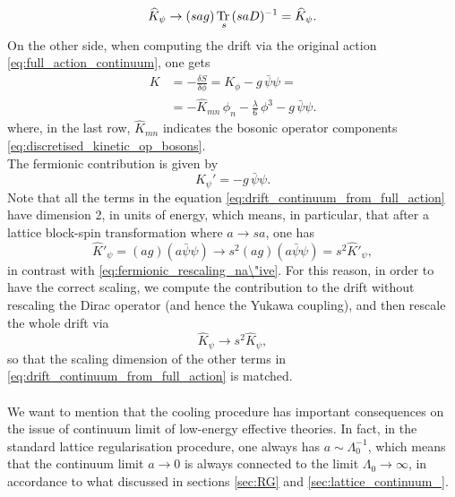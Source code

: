\begin{equation}
    \widehat{K}_{\psi} \to  (sag) \, \underset{s}{\operatorname{\text{Tr} \,}}{(saD)^{-1}} = \widehat{K}_{\psi}.
    \label{eq:fermionic_rescaling_na\"ive}
\end{equation}
On the other side, when computing the drift via the original action \eqref{eq:full_action_continuum}, one gets
\begin{equation}
    \begin{aligned}
        K &= - \frac{\delta S}{\delta \phi} = K_\phi - g \, \bar\psi\psi = \\
        &= - \hat K_{mn} \, \phi_n - \frac{\lambda}{6} \, \phi^3 - g \, \bar\psi\psi.
    \end{aligned}
    \label{eq:drift_continuum_from_full_action}
\end{equation}
where, in the last row, $\widehat{K}_{mn}$ indicates the bosonic operator components \eqref{eq:discretised_kinetic_op_bosons}.\\
The fermionic contribution is given by
\begin{equation*}
    K_{\psi}' = - g \, \bar\psi\psi.
\end{equation*}
Note that all the terms in the equation \eqref{eq:drift_continuum_from_full_action} have dimension 2, in units of energy, which means, in particular, that after a lattice block-spin transformation where $a \to sa$, one has
\begin{equation}
    \widehat{K}'_\psi = (ag) (a\bar\psi \psi) \to s^2 (ag) (a\bar\psi \psi) = s^2 \widehat{K}'_\psi,
    \label{eq:rescaling_blinear}
\end{equation}
in contrast with \eqref{eq:fermionic_rescaling_na\"ive}. For this reason, in order to have the correct scaling, we compute the contribution to the drift without rescaling the Dirac operator (and hence the Yukawa coupling), and then rescale the whole drift via 
\begin{equation*}
    \widehat{K}_\psi \to s^2 \widehat{K}_\psi,
\end{equation*}
so that the scaling dimension of the other terms in \eqref{eq:drift_continuum_from_full_action} is matched. \\~\\
We want to mention that the cooling procedure has important consequences on the issue of continuum limit of low-energy effective theories. In fact, in the standard lattice regularisation procedure, one always has $a \sim \Lambda_0^{-1}$, which means that the continuum limit $a \to 0$ is always connected to the limit $\Lambda_0 \to \infty$, in accordance to what discussed in sections \ref{sec:RG} and \ref{sec:lattice_continuum_}.

